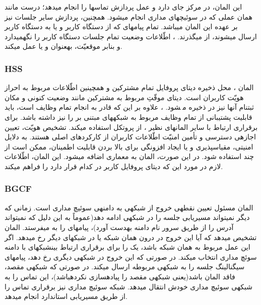 \indent این المان، در مرکز  جای دارد و عمل پردازش تماس\nf ها را انجام می\nf دهد؛ درست مانند همان عملی که در سوئیچ\nf های مداری انجام می\nf شود. همچنین، پردازش سایر جلسات نیز بر عهده این المان می\nf باشد. تمام پیام\nf های  که از دستگاه کاربر و یا به دستگاه کاربر ارسال می\nf شوند، از  می\nf گذرند. ، اطّلاعات وضعیت تمام جلسات دستگاه کاربر را نگه\nf می\nf دارد و بنابر موقعیّت، به\nf عنوان  و یا  عمل می\nf کند.

\subsubsection{HSS}

المان ،‌	 محل ذخیره دیتای پروفایل تمام مشترکین و همچینین اطّلاعات مربوط به احراز هویّت کاربران است. دیتای موقّتِ مربوط به مشترکین مانند وضعیت کنونی و مکان ثبت\nf نام آن\nf ها نیز در  ذخیره میٖ\nf شود. ، علاوه بر این که قادر به انجام تمام وظایف  است،‌	 باید قابلیت پشتیبانی از تمام وظایف مربوط به 	شبکه\nf های مبتنی بر  را نیز داشته باشد.  برای برقراری ارتباط با سایر المان\nf های  نظیر ، از پروتکل  استفاده می\nf کند. تشخیص هویّت،‌ تعیین اجازه\nf ی دسترسی و تأمین امنیّت اطّلاعات کاربران از کارکردهای اصلی  هستند. به دلایل امنیتی، مقیاس\nf پذیری و  یا ایجاد افزونگی برای بالا بردن قابلیت اطمینان،‌ ممکن است از چند  استفاده شود. در این صورت،‌ المان  به معماری  اضافه می\nf شود. این المان،‌ اطّلاعات لازم در مورد این که دیتای پروفایل کاربر در کدام  قرار دارد را فراهم می\nf کند. 


\subsubsection{BGCF}

المان  مسئول تعیین نقطه\nf ی خروج از شبکه\nf ی   به دامنه\nf ی سوئیچ مداری است. زمانی که  دیگر نمی\nf تواند مسیریابی جلسه را در شبکه\nf ی  ادامه دهد(عموماً به این دلیل که نمی\nf تواند آدرس را از طریق  سرور نام دامنه به\nf دست آورد)، پیام\nf های  را به  می\nf فرستد. المان  تشخیص می\nf دهد که آیا این خروج در درون همان شبکه یا در شبکه\nf ای دیگر رخ می\nf دهد. اگر این عمل مربوط به همان شبکه باشد،  یک  را برای برقراری ارتباط بین\nf شبکه\nf ای با دامنه سوئچ مداری انتخاب می\nf کند. در صورتی که این خروج در شبکه\nf ی دیگری رخ دهد،  پیام\nf های سیگنالینگ جلسه را به  شبکه\nf ی مربوطه ارسال می\nf کند. در صورتی که شبکه\nf ی مقصد، فاقد المان  باشد(یعنی شبکه\nf ی مقصد  را پیاده\nf سازی نکرده\nf باشد)،  این تماس را به شبکه\nf ی سوئیچ مداری خودش انتقال می\nf دهد. شبکه سوئیچ مداری نیز برقراری تماس را از طریق مسیریابی استاندارد  انجام می\nf دهد.


